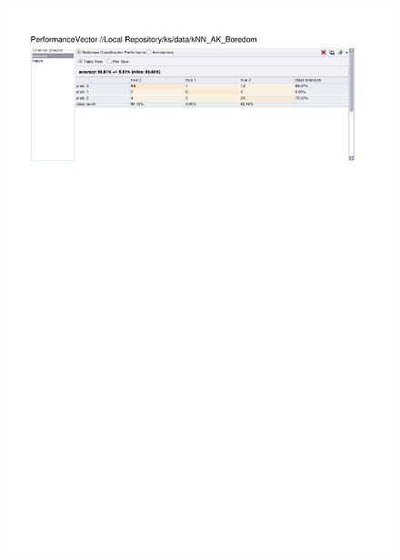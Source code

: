 \begin{figure}[htp]
  \centerline{\includegraphics[trim=0 680 0 60,clip,width=16.09cm]{results/kNN_A_Boredom.pdf}} \caption{
} \label{kNN_A_Boredom}
\end{figure}

